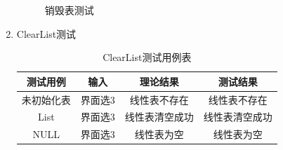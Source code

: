 \documentclass[supercite]{HustGraduPaper}
\theoremstyle{definition}
\begin{document}
\begin{enumerate}
\begin{figure}[htb]
		      \caption{销毁表测试}
	      \end{figure}
	      \newpage
	\item ClearList测试
	      \begin{table}[htb]
		      \begin{center}
			      \setlength{\tabcolsep}{2.0mm}
			      \caption{ClearList测试用例表}
			      \label{table14}
			      \begin{tabular}{|c|c|c|c|}
				      \hline
				      测试用例   & 输入    & 理论结果       & 测试结果       \\
				      \hline
				      \hline
				      未初始化表 & 界面选3 & 线性表不存在   & 线性表不存在   \\
				      \hline
				      List       & 界面选3 & 线性表清空成功 & 线性表清空成功 \\
				      \hline
				      NULL       & 界面选3 & 线性表为空     & 线性表为空     \\
				      \hline
			      \end{tabular}
		      \end{center}
	      \end{table}
	      \begin{figure}[htb]
		      \centering
		      \quad
		      \quad
		      \\

\end{figure}
\end{enumerate}
\end{document}
